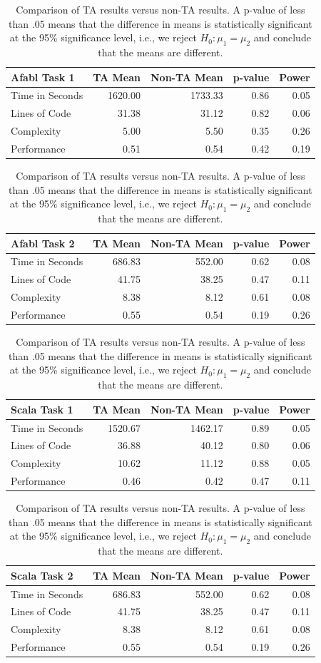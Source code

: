 \begin{center}
\begin{table}[h]

\begin{center}
\begin{tabular}{|l|r|r|r|r|}\hline
Afabl Task 1 & TA Mean & Non-TA Mean & p-value & Power\\\hline
Time in Seconds & 1620.00 & 1733.33 & 0.86 & 0.05\\
Lines of Code & 31.38 & 31.12 & 0.82 & 0.06\\
Complexity & 5.00 & 5.50 & 0.35 & 0.26\\
Performance & 0.51 & 0.54 & 0.42 & 0.19\\
\hline
\end{tabular}


\begin{tabular}{|l|r|r|r|r|}\hline
Afabl Task 2 & TA Mean & Non-TA Mean & p-value & Power\\\hline
Time in Seconds & 686.83 & 552.00 & 0.62 & 0.08\\
Lines of Code & 41.75 & 38.25 & 0.47 & 0.11\\
Complexity & 8.38 & 8.12 & 0.61 & 0.08\\
Performance & 0.55 & 0.54 & 0.19 & 0.26\\
\hline
\end{tabular}


\begin{tabular}{|l|r|r|r|r|}\hline
Scala Task 1 & TA Mean & Non-TA Mean & p-value & Power\\\hline
Time in Seconds & 1520.67 & 1462.17 & 0.89 & 0.05\\
Lines of Code & 36.88 & 40.12 & 0.80 & 0.06\\
Complexity & 10.62 & 11.12 & 0.88 & 0.05\\
Performance & 0.46 & 0.42 & 0.47 & 0.11\\
\hline
\end{tabular}


\begin{tabular}{|l|r|r|r|r|}\hline
Scala Task 2 & TA Mean & Non-TA Mean & p-value & Power\\\hline
Time in Seconds & 686.83 & 552.00 & 0.62 & 0.08\\
Lines of Code & 41.75 & 38.25 & 0.47 & 0.11\\
Complexity & 8.38 & 8.12 & 0.61 & 0.08\\
Performance & 0.55 & 0.54 & 0.19 & 0.26\\
\hline
\end{tabular}

\end{center}
\caption{Comparison of TA results versus non-TA results. A p-value of less than .05 means that the difference in means is statistically significant at the 95\% significance level, i.e., we reject $H_0: \mu_1 = \mu_2$ and conclude that the means are different.}
\label{tbl:tas-vs-non-tas}
\end{table}
\end{center}



